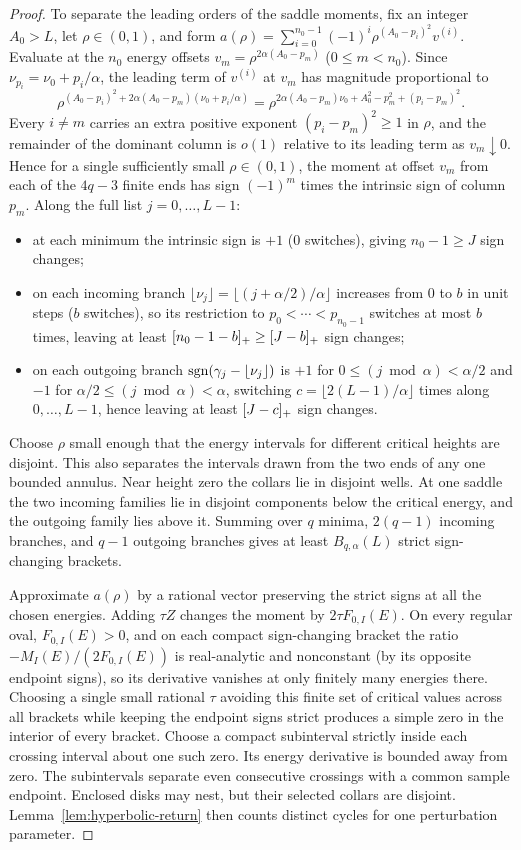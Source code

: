 \begin{proof}
To separate the leading orders of the saddle moments, fix an integer $A_0>L$, let $\rho\in(0,1)$, and form $a(\rho)=\sum_{i=0}^{n_0-1}(-1)^i\rho^{(A_0-p_i)^2} v^{(i)}$. Evaluate at the $n_0$ energy offsets $v_m=\rho^{2\alpha(A_0-p_m)}$ ($0\le m<n_0$). Since $\nu_{p_i}=\nu_0+p_i/\alpha$, the leading term of $v^{(i)}$ at $v_m$ has magnitude proportional to
\[
  \rho^{(A_0-p_i)^2 + 2\alpha(A_0-p_m)(\nu_0+p_i/\alpha)}
  = \rho^{2\alpha(A_0-p_m)\nu_0 + A_0^2 - p_m^2 + (p_i-p_m)^2}.
\]
Every $i\ne m$ carries an extra positive exponent $(p_i-p_m)^2\ge 1$ in $\rho$, and the remainder of the dominant column is \(o(1)\) relative to its leading term as \(v_m\downarrow0\). Hence for a single sufficiently small $\rho\in(0,1)$, the moment at offset $v_m$ from each of the $4q-3$ finite ends has sign $(-1)^m$ times the intrinsic sign of column $p_m$. Along the full list $j=0,\dots,L-1$:
\begin{itemize}[nosep]
  \item at each minimum the intrinsic sign is $+1$ ($0$ switches), giving $n_0-1\ge J$ sign changes;
  \item on each incoming branch $\lfloor\nu_j\rfloor=\lfloor(j+\alpha/2)/\alpha\rfloor$ increases from $0$ to $b$ in unit steps ($b$ switches), so its restriction to $p_0<\cdots<p_{n_0-1}$ switches at most $b$ times, leaving at least $[n_0-1-b]_+\ge[J-b]_+$ sign changes;
  \item on each outgoing branch $\operatorname{sgn}(\gamma_j-\lfloor\nu_j\rfloor)$ is $+1$ for $0\le(j\bmod\alpha)<\alpha/2$ and $-1$ for $\alpha/2\le(j\bmod\alpha)<\alpha$, switching $c=\lfloor 2(L-1)/\alpha\rfloor$ times along $0,\dots,L-1$, hence leaving at least $[J-c]_+$ sign changes.
\end{itemize}
Choose \(\rho\) small enough that the energy intervals for different critical heights are disjoint. This also separates the intervals drawn from the two ends of any one bounded annulus. Near height zero the collars lie in disjoint wells. At one saddle the two incoming families lie in disjoint components below the critical energy, and the outgoing family lies above it. Summing over $q$ minima, $2(q-1)$ incoming branches, and $q-1$ outgoing branches gives at least $B_{q,\alpha}(L)$ strict sign-changing brackets.

Approximate $a(\rho)$ by a rational vector preserving the strict signs at all the chosen energies. Adding $\tau Z$ changes the moment by $2\tau F_{0,I}(E)$. On every regular oval, $F_{0,I}(E)>0$, and on each compact sign-changing bracket the ratio $-M_I(E)/(2F_{0,I}(E))$ is real-analytic and nonconstant (by its opposite endpoint signs), so its derivative vanishes at only finitely many energies there. Choosing a single small rational $\tau$ avoiding this finite set of critical values across all brackets while keeping the endpoint signs strict produces a simple zero in the interior of every bracket. Choose a compact subinterval strictly inside each crossing interval about one such zero. Its energy derivative is bounded away from zero. The subintervals separate even consecutive crossings with a common sample endpoint. Enclosed disks may nest, but their selected collars are disjoint. Lemma~\ref{lem:hyperbolic-return} then counts distinct cycles for one perturbation parameter.
\end{proof}
